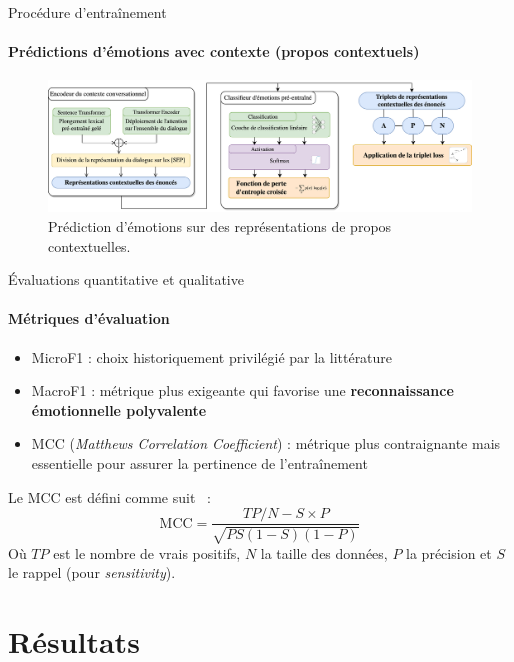 \documentclass[11pt,aspectratio=169]{beamer}
\begin{document}
\begin{frame}{Procédure d'entraînement}
    \framesubtitle{Prédictions d'émotions \textbf{avec contexte} (propos contextuels)}
    \begin{figure}
        \centering
        \includegraphics[width=\textwidth]{contextual_utterances_training_fr.png}
        \caption{\centering Prédiction d'émotions sur des représentations de propos contextuelles.}
    \end{figure}
\end{frame}

\begin{frame}{Évaluations quantitative et qualitative}
    \framesubtitle{Métriques d'évaluation}
\begin{itemize}
    \item MicroF1 : choix historiquement privilégié par la littérature
    \item MacroF1 : métrique plus exigeante qui favorise une \textcolor{roose}{\bf reconnaissance émotionnelle polyvalente}
    \item MCC (\textsl{Matthews Correlation Coefficient}) : métrique plus contraignante mais essentielle pour assurer la pertinence de l'entraînement
\end{itemize}
Le MCC est défini comme suit~ :
\begin{equation}
    \text{MCC} = \frac{\mathit{TP}/ N-S \times P}{\sqrt{P S(1-S)(1-P)}}
\end{equation}
Où $TP$ est le nombre de vrais positifs, $N$ la taille des données, $P$ la précision et $S$ le rappel (pour \textsl{sensitivity}).
\end{frame}

\section{Résultats}
\end{document}
